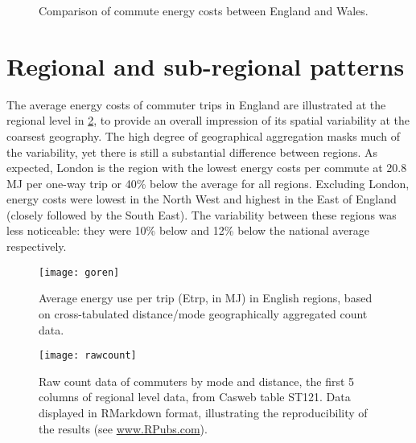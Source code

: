 \begin{figure}
 \centering{
 \texttt{[image: ew]} }
 \caption{Comparison of commute energy costs between England and Wales.}
 \label{few}
\end{figure}



\section{Regional and sub-regional patterns} \label{sregional}
The average energy costs of commuter trips in England
are illustrated at the regional level in \cref{fgoren}, to provide an
overall impression of its spatial variability at the coarsest geography.
The high degree of geographical aggregation masks much of the variability,
yet there is still a substantial difference between regions. As expected,
London is the region with the lowest energy costs per commute at
20.8 MJ per one-way trip or 40\% below the average for all regions.
Excluding London, energy costs were lowest in the North West
and highest in the East of England (closely followed by the South East).
The variability between these regions was less noticeable:
they were 10\% below and 12\% below the national average respectively.


\begin{figure}[htbp]
\begin{center}
    \texttt{[image: goren]}  \end{center}
  \caption[Average energy use per trip (Etrp, in MJ) in English regions]
  {Average energy use per trip (Etrp, in MJ) in English regions, based
  on cross-tabulated distance/mode geographically aggregated count data.}
 \label{fgoren}
\end{figure}

\begin{figure}[htbp]
\begin{center}
    \texttt{[image: rawcount]}  \end{center}
  \caption[Raw count data of commuters by mode and distance.]
  {Raw count data of commuters by mode and distance, the first 5 columns of
  regional level data, from Casweb table ST121. Data displayed in RMarkdown
  format, illustrating the reproducibility of the results (see
  \href{http://rpubs.com/robinlovelace}{www.RPubs.com}).}
 \label{frcount}
\end{figure}

